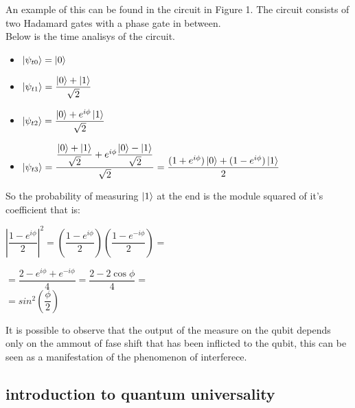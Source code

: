 \documentclass{article}
\begin{document}
            

An example of this can be found in the circuit in Figure 1.
The circuit consists of two Hadamard gates with a phase gate
in between.\\
Below is the time analisys of the circuit.
\begin{itemize}

\item $\ket{\psi_{t0}} = \ket{0}$
\item $\ket{\psi_{t1}} = \dfrac{\ket{0}+\ket{1}}{\sqrt{2}}$
\item $\ket{\psi_{t2}} = \dfrac{\ket{0}+e^{i\phi}\ket{1}}{\sqrt{2}}$
\item $\ket{\psi_{t3}} = \dfrac{\dfrac{\ket{0}+\ket{1}}{\sqrt{2}}+e^{i\phi}\dfrac{\ket{0}-\ket{1}}
    {\sqrt{2}}}{\sqrt{2}}   = \dfrac{(1+e^{i\phi})\ket{0}+(1-e^{i\phi})\ket{1}}{2}$
  
  
  
  
\end{itemize}

\vspace{20pt}

So the probability of measuring $\ket{1}$ at the end is the module squared of it's coefficient
that is:\\
\vspace{10pt}

$\left|\dfrac{1-e^{i\phi}}{2}\right|^2 = \left(\dfrac{1-e^{i\phi}}{2}\right)\left(\dfrac{1-e^{-i\phi}}{2}\right) =$\\
 \vspace{5pt}

 
$ = \dfrac{2-e^{i\phi}+e^{-i\phi}}{4} = \dfrac{2-2\cos{\phi}}{4} =$\\

\vspace{3pt}
$ = sin^2{\left(\dfrac{\phi}{2}\right)}$

\vspace{10pt}



It is possible to observe that the output of the measure on the qubit
depends only on the ammout of fase shift that has been inflicted
to the qubit, this can be seen as a manifestation of the phenomenon
of interferece.



\subsection{introduction to quantum universality}
\end{document}
